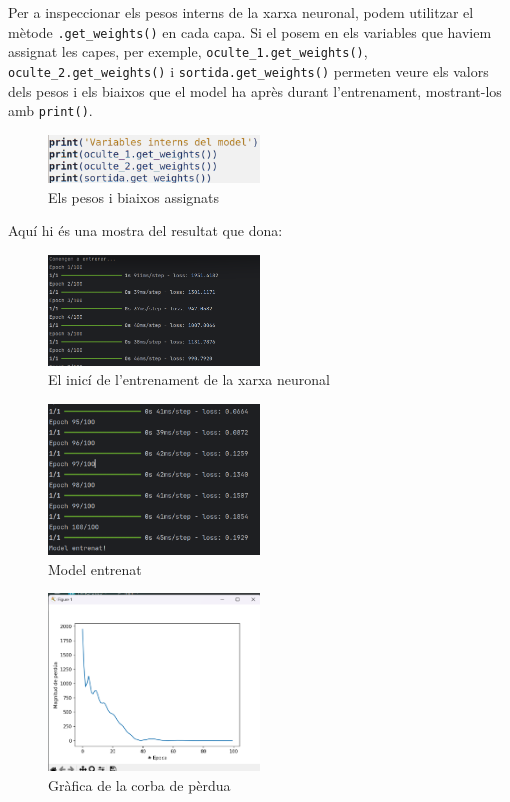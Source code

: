 Per a inspeccionar els pesos interns de la xarxa neuronal, podem utilitzar el mètode \texttt{.get\_weights()} en cada capa. Si el posem en els variables que haviem assignat les capes, per exemple, \texttt{oculte\_1.get\_weights()}, \texttt{oculte\_2.get\_weights()} i \texttt{sortida.get\_weights()} permeten veure els valors dels pesos i els biaixos que el model ha après durant l’entrenament, mostrant-los amb \texttt{print()}.


\begin{figure}[H]
    \centering
    \includegraphics[width=0.5\textwidth]{./figures/9.png}
    \caption{Els pesos i biaixos assignats}
\end{figure}

Aquí hi és una mostra del resultat que dona:

\begin{figure}[H]
    \centering
    \includegraphics[width=0.5\textwidth]{./figures/10.png}
    \caption{El inicí de l'entrenament de la xarxa neuronal}
\end{figure}

\begin{figure}[H]
    \centering
    \includegraphics[width=0.5\textwidth]{./figures/11.png}
    \caption{Model entrenat}
\end{figure}


\begin{figure}[H]
    \centering
    \includegraphics[width=0.5\textwidth]{./figures/12.png}
    \caption{Gràfica de la corba de pèrdua}
\end{figure}


